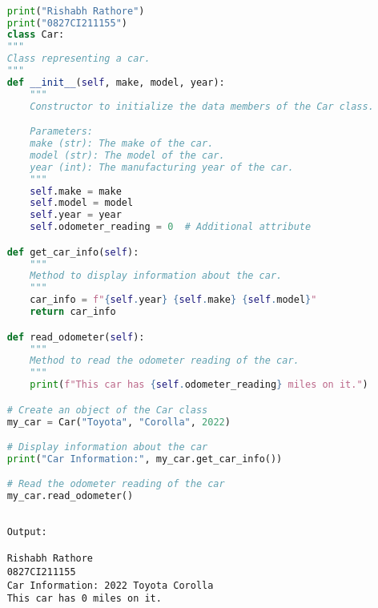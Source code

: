 \documentclass{report}
\begin{document}
\sol
\begin{lstlisting}[language=Python]

	print("Rishabh Rathore")
	print("0827CI211155")
	class Car:
    """
    Class representing a car.
    """
    def __init__(self, make, model, year):
        """
        Constructor to initialize the data members of the Car class.

        Parameters:
        make (str): The make of the car.
        model (str): The model of the car.
        year (int): The manufacturing year of the car.
        """
        self.make = make
        self.model = model
        self.year = year
        self.odometer_reading = 0  # Additional attribute

    def get_car_info(self):
        """
        Method to display information about the car.
        """
        car_info = f"{self.year} {self.make} {self.model}"
        return car_info

    def read_odometer(self):
        """
        Method to read the odometer reading of the car.
        """
        print(f"This car has {self.odometer_reading} miles on it.")

	# Create an object of the Car class
	my_car = Car("Toyota", "Corolla", 2022)

	# Display information about the car
	print("Car Information:", my_car.get_car_info())

	# Read the odometer reading of the car
	my_car.read_odometer()
  

\end{lstlisting}

\begin{verbatim}
	Output:

	Rishabh Rathore
	0827CI211155
	Car Information: 2022 Toyota Corolla
	This car has 0 miles on it.
	

\end{verbatim}


\newpage
\end{document}
